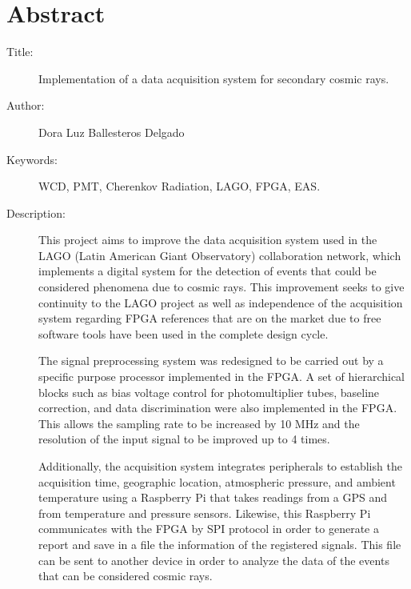 \chapter*{Abstract}

\footnotesize{
\begin{description}
  \item[Title:] Implementation of a data acquisition system for secondary cosmic rays.
  \item[Author:] Dora Luz Ballesteros Delgado
  \item[Keywords:] WCD, PMT, Cherenkov Radiation, LAGO, FPGA, EAS.
  \item[Description:] 
This project aims to improve the data acquisition system used in the LAGO (Latin American Giant Observatory) collaboration network, which implements a digital system for the detection of events that could be considered phenomena due to cosmic rays.
This improvement seeks to give continuity to the LAGO project as well as independence of the acquisition system regarding FPGA references that are on the market due to free software tools have been used in the complete design cycle.

The signal preprocessing system was redesigned to be carried out by a specific purpose processor implemented in the FPGA.
A set of hierarchical blocks such as bias voltage control for photomultiplier tubes, baseline correction, and data discrimination were also implemented in the FPGA.
This allows the sampling rate to be increased by 10 MHz and the resolution of the input signal to be improved up to 4 times.

Additionally, the acquisition system integrates peripherals to establish the acquisition time, geographic location, atmospheric pressure, and ambient temperature using a Raspberry Pi that takes readings from a GPS and from temperature and pressure sensors.
Likewise, this Raspberry Pi communicates with the FPGA by SPI protocol in order to generate a report and save in a file the information of the registered signals.
This file can be sent to another device in order to analyze the data of the events that can be considered cosmic rays.

\end{description}}\normalsize
